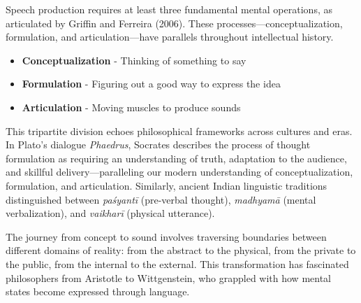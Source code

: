 \documentclass[12pt,a4paper]{article}
\begin{document}
Speech production requires at least three fundamental mental operations, as articulated by Griffin and Ferreira (2006). These processes—conceptualization, formulation, and articulation—have parallels throughout intellectual history.

\begin{tcolorbox}[colback=green!5!white,colframe=green!75!black,title=The Speech Production Trinity]
\begin{itemize}
\item \textbf{Conceptualization} - Thinking of something to say
\item \textbf{Formulation} - Figuring out a good way to express the idea
\item \textbf{Articulation} - Moving muscles to produce sounds
\end{itemize}
\end{tcolorbox}

This tripartite division echoes philosophical frameworks across cultures and eras. In Plato's dialogue \textit{Phaedrus}, Socrates describes the process of thought formulation as requiring an understanding of truth, adaptation to the audience, and skillful delivery—paralleling our modern understanding of conceptualization, formulation, and articulation. Similarly, ancient Indian linguistic traditions distinguished between \textit{paśyantī} (pre-verbal thought), \textit{madhyamā} (mental verbalization), and \textit{vaikharī} (physical utterance).

The journey from concept to sound involves traversing boundaries between different domains of reality: from the abstract to the physical, from the private to the public, from the internal to the external. This transformation has fascinated philosophers from Aristotle to Wittgenstein, who grappled with how mental states become expressed through language.
\end{document}
